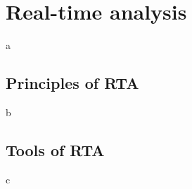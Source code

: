 \section{Real-time analysis}
\label{sec-3}
a



\subsection{Principles of RTA}
\label{sec-4}
b

\subsection{Tools of RTA}
\label{sec-5}
c